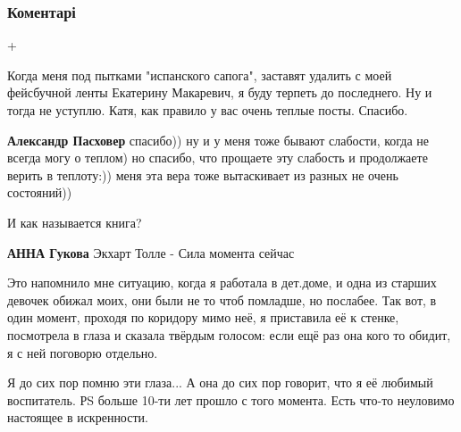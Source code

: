  
 
 
 
 
\subsubsection{Коментарі}
\label{sec:30_10_2019.fb.makarevich_ekaterina.1.ulybka_iskrennjaja.cmt}

\begin{itemize} %
+


Когда меня под пытками "испанского сапога", заставят удалить с моей фейсбучной
ленты Екатерину Макаревич, я буду терпеть до последнего. Ну и тогда не
уступлю. Катя, как правило у вас очень теплые посты. Спасибо.

\begin{itemize} %
\textbf{Александр Пасховер} спасибо)) ну и у меня тоже бывают слабости, когда не всегда могу о теплом) но спасибо, что прощаете эту слабость и продолжаете верить в теплоту:)) меня эта вера тоже вытаскивает из разных не очень состояний))
\end{itemize} %

И как называется книга?

\begin{itemize} %
\textbf{АННА Гукова} Экхарт Толле - Сила момента сейчас
\end{itemize} %


Это напомнило мне ситуацию, когда я работала в дет.доме, и одна из старших
девочек обижал моих, они были не то чтоб помладше, но послабее. Так вот, в один
момент, проходя по коридору мимо неё, я приставила её к стенке, посмотрела в
глаза и сказала твёрдым голосом: если ещё раз она кого то обидит, я с ней
поговорю отдельно.

Я до сих пор помню эти глаза...
А она до сих пор говорит, что я её любимый воспитатель.
РS больше 10-ти лет прошло с того момента.
Есть что-то неуловимо настоящее в искренности.



\end{itemize}

